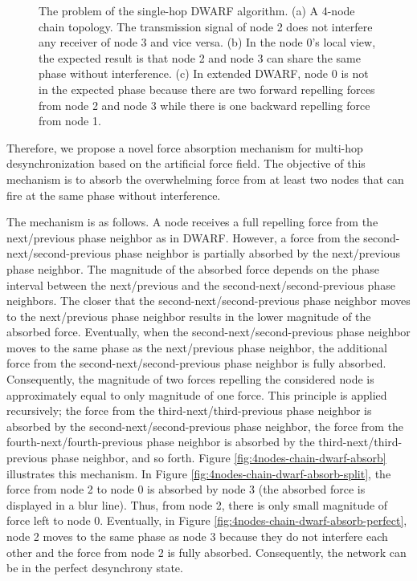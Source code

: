 \begin{figure}[!t]
{{	\label{fig:4nodes-chain-dwarf}}
}
\caption{The problem of the single-hop DWARF algorithm. (a) A 4-node chain topology. The transmission signal of node 2 does not interfere any receiver of node 3 and vice versa. (b) In the node 0's local view, the expected result is that node 2 and node 3 can share the same phase without interference. (c) In extended DWARF, node 0 is not in the expected phase because there are two forward repelling forces from node 2 and node 3 while there is one backward repelling force from node 1.}
\label{fig:4nodes-chain}
\lofcont
\end{figure}

Therefore, we propose a novel force absorption mechanism for multi-hop desynchronization based on the artificial force field.
The objective of this mechanism is to absorb the overwhelming force from at least two nodes that can fire at the same phase without interference.

The mechanism is as follows. A node receives a full repelling force from the next/previous phase neighbor as in DWARF. However, a force from the second-next/second-previous phase neighbor is partially absorbed by the next/previous phase neighbor. The magnitude of the absorbed force depends on the phase interval between the next/previous and the second-next/second-previous phase neighbors.  The closer that the second-next/second-previous phase neighbor moves to the next/previous phase neighbor results in the lower magnitude of the absorbed force. Eventually, when the second-next/second-previous phase neighbor moves to the same phase as the next/previous phase neighbor, the additional force from the second-next/second-previous phase neighbor is fully absorbed. Consequently, the magnitude of two forces repelling the considered node is approximately equal to only magnitude of one force. This principle is applied recursively; the force from the third-next/third-previous phase neighbor is absorbed by the second-next/second-previous phase neighbor, the force from the fourth-next/fourth-previous phase neighbor is absorbed by the third-next/third-previous phase neighbor, and so forth.   
Figure \ref{fig:4nodes-chain-dwarf-absorb} illustrates this mechanism. In Figure \ref{fig:4nodes-chain-dwarf-absorb-split}, the force from node 2 to node 0 is absorbed by node 3 (the absorbed force is displayed in a blur line). Thus, from node 2, there is only small magnitude of force left to node 0. Eventually, in Figure \ref{fig:4nodes-chain-dwarf-absorb-perfect}, node 2 moves to the same phase as node 3 because they do not interfere each other and the force from node 2 is fully absorbed. Consequently, the network can be in the perfect desynchrony state.

